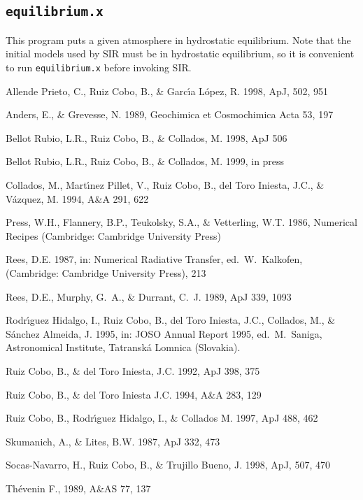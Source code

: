 \documentclass[11pt]{report}
\begin{document}
\subsection{{\tt equilibrium.x}}
This program puts a given atmosphere in hydrostatic equilibrium. Note
that the initial models used by SIR must be in hydrostatic equilibrium, so
it is convenient to run {\tt equilibrium.x} before invoking SIR. 


\begin{thebibliography}{99}

\bibitem{} Allende Prieto, C., Ruiz Cobo, B., \& Garc\'{\i}a L\'opez, R. 1998, ApJ, 502, 951

\bibitem{} Anders, E., \& Grevesse, N. 1989, Geochimica et Cosmochimica Acta 53, 197 

\bibitem{} Bellot Rubio, L.R., Ruiz Cobo, B., \& Collados, M. 1998, ApJ 506

\bibitem{} Bellot Rubio, L.R., Ruiz Cobo, B., \& Collados, M. 1999, in press

\bibitem{} Collados, M., Mart\'{\i}nez Pillet, V., Ruiz Cobo, B., del Toro Iniesta, J.C., 
\& V\'azquez, M. 1994, A\&A 291, 622 

\bibitem{} Press, W.H., Flannery, B.P., Teukolsky, S.A., \& Vetterling, W.T.
1986, Numerical Recipes (Cambridge:  Cambridge University Press)

\bibitem{} Rees, D.E. 1987, in: Numerical Radiative Transfer, ed.\ W.\ Kalkofen, (Cambridge: Cambridge University Press), 213

\bibitem{} Rees, D.E., Murphy, G.\ A., \& Durrant, C.\ J. 1989, ApJ 339, 1093

\bibitem{} Rodr\'{\i}guez Hidalgo, I., Ruiz Cobo, B., del Toro Iniesta, J.C.,
Collados, M., \& S\'anchez Almeida, J. 1995, in: JOSO Annual Report
1995, ed.\ M.\ Saniga, Astronomical Institute, Tatransk\'a Lomnica
(Slovakia).

\bibitem{} Ruiz Cobo, B., \&  del Toro Iniesta, J.C. 1992, ApJ  398, 375

\bibitem{} Ruiz Cobo, B., \& del Toro Iniesta J.C. 1994, A\&A 283, 129

\bibitem{} Ruiz Cobo, B., Rodr\'{\i}guez Hidalgo, I., \& Collados M. 1997, ApJ 488, 462

\bibitem{} Skumanich, A., \& Lites, B.W. 1987, ApJ 332, 473

\bibitem{} Socas-Navarro, H., Ruiz Cobo, B., \& Trujillo Bueno, J. 1998, ApJ, 507, 470

 Th\'evenin F., 1989, A\&AS 77, 137


\end{thebibliography}
\end{document}
